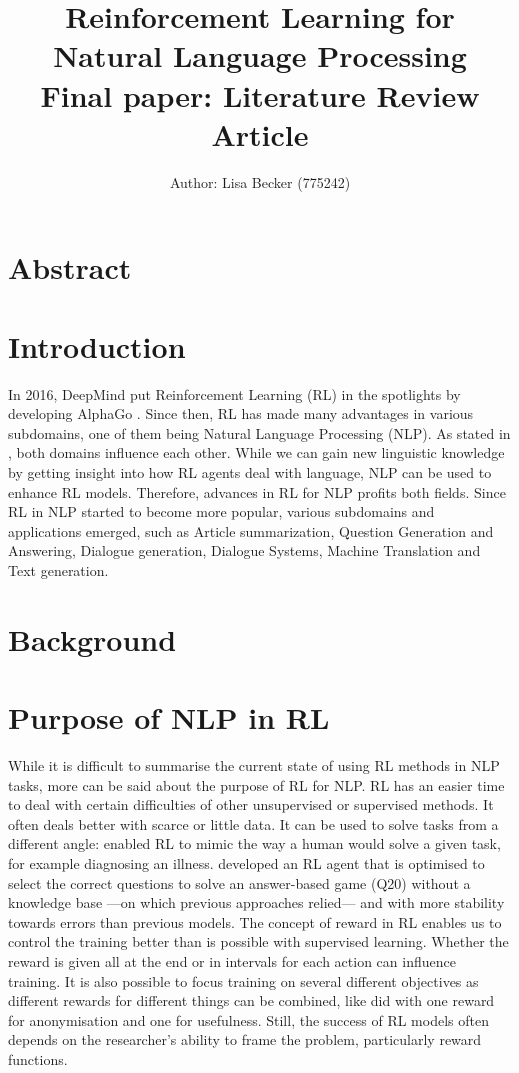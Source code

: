 \documentclass[11pt,a4paper]{article}
\title{{\LARGE Reinforcement Learning for Natural Language Processing}\\[1.5mm]
{\large Final paper: Literature Review Article}\\[1.5mm]}
\author{Author: Lisa Becker (775242) }
\begin{document}
\maketitle
\section{Abstract}


\section{Introduction}
In 2016, DeepMind put Reinforcement Learning (RL) in the spotlights by developing AlphaGo \citep{alphago}. Since then, RL has made many advantages in various subdomains, one of them being Natural Language Processing (NLP). As stated in \citet{ijcai2019}, both domains influence each other. While we can gain new linguistic knowledge by getting insight into how RL agents deal with language, NLP can be used to enhance RL models. Therefore, advances in RL for NLP profits both fields. Since RL in NLP started to become more popular, various subdomains and applications emerged, such as Article summarization, Question Generation and Answering, Dialogue generation, Dialogue Systems, Machine Translation and Text generation. 

\section{Background}

\section{Purpose of NLP in RL}
While it is difficult to summarise the current state of using RL methods in NLP tasks, more can be said about the purpose of RL for NLP. RL has an easier time to deal with certain difficulties of other unsupervised or supervised methods. It often deals better with scarce or little data. It can be used to solve tasks from a different angle: \citet{ling-etal-2017-learning} enabled RL to mimic the way a human would solve a given task, for example diagnosing an illness. \citet{hu-etal-2018-playing} developed an RL agent that is optimised to select the correct questions to solve an answer-based game (Q20) without a knowledge base ---on which previous approaches relied--- and with more stability towards errors than previous models. The concept of reward in RL enables us to control the training better than is possible with supervised learning. Whether the reward is given all at the end or in intervals for each action can influence training. It is also possible to focus training on several different objectives as different rewards for different things can be combined, like \citet{mosallanezhad-etal-2019-deep} did with one reward for anonymisation and one for usefulness. Still, the success of RL models often depends on the researcher's ability to frame the problem, particularly reward functions.
\end{document}
